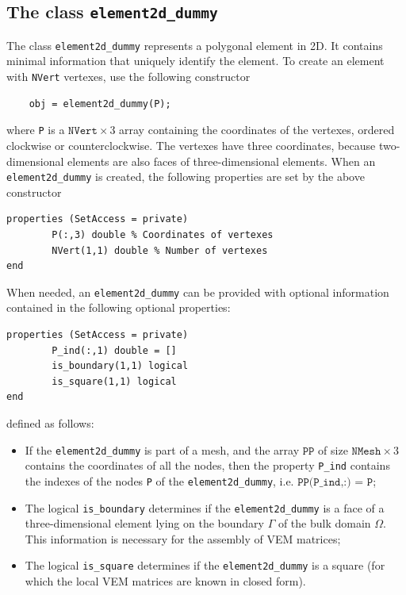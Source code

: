 \documentclass[a4paper]{article}
\begin{document}
\subsection{The class \texttt{element2d\_dummy}}
The class \texttt{element2d\_dummy} represents a polygonal element in 2D. It contains minimal information that uniquely identify the element. To create an element with \texttt{NVert} vertexes, use the following constructor
\begin{lstlisting}
	obj = element2d_dummy(P);
\end{lstlisting}
where \texttt{P} is a $\texttt{NVert} \times 3$ array containing the coordinates of the vertexes, ordered clockwise or counterclockwise. The vertexes have three coordinates, because two-dimensional elements are also faces of three-dimensional elements. When an \texttt{element2d\_dummy} is created, the following properties are set by the above constructor
\begin{lstlisting}
properties (SetAccess = private)
        P(:,3) double % Coordinates of vertexes
        NVert(1,1) double % Number of vertexes
end
\end{lstlisting}
When needed, an \texttt{element2d\_dummy} can be provided with optional information contained in the following optional properties:
\begin{lstlisting}
properties (SetAccess = private)
        P_ind(:,1) double = []
        is_boundary(1,1) logical
        is_square(1,1) logical
end
\end{lstlisting}
defined as follows:
\begin{itemize}
\item If the \texttt{element2d\_dummy} is part of a mesh, and the array $\texttt{PP}$ of size $\texttt{NMesh} \times 3$ contains the coordinates of all the nodes, then the property \texttt{P\_ind} contains the indexes of the nodes \texttt{P} of the \texttt{element2d\_dummy}, i.e. $\texttt{PP(P\_ind,:) = P}$;
\item The logical \texttt{is\_boundary} determines if the \texttt{element2d\_dummy} is a face of a three-dimensional element lying on the boundary $\Gamma$ of the bulk domain $\Omega$. This information is necessary for the assembly of VEM matrices; 
\item The logical \texttt{is\_square} determines if the \texttt{element2d\_dummy} is a square (for which the local VEM matrices are known in closed form).
\end{itemize}
\end{document}
